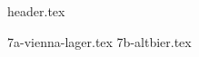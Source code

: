 \clearpage
{}
\divisorLine
{header.tex}
\begin{multicols}{2}
{7a-vienna-lager.tex}
{7b-altbier.tex}
\end{multicols}